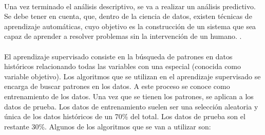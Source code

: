 \documentclass[spanish,12pt, a4paper,twoside]{paper}
\begin{document}
\paragraph{}
Una vez terminado el análisis descriptivo, se va a realizar un análisis predictivo. Se debe tener en cuenta, que, dentro de la ciencia de datos, existen técnicas de aprendizaje automáticas, cuyo objetivo es la construcción de un sistema que sea capaz de aprender a resolver problemas sin la intervención de un humano. \cite{Marin2018}.
\paragraph{}
El aprendizaje supervisado consiste en la búsqueda de patrones en datos históricos relacionando todas las variables con una especial (conocida como variable objetivo). Los algoritmos que se utilizan en el aprendizaje supervisado se encarga de buscar patrones en los datos. A este proceso se conoce como entrenamiento de los datos. Una vez que se tienen los patrones, se aplican a los datos de prueba. Los datos de entrenamiento suelen ser una selección aleatoria y única de los datos históricos de un 70\% del total. Los datos de prueba son el restante 30\%. \cite{Manguart2017}
Algunos de los algoritmos que se van a utilizar son:
\end{document}

